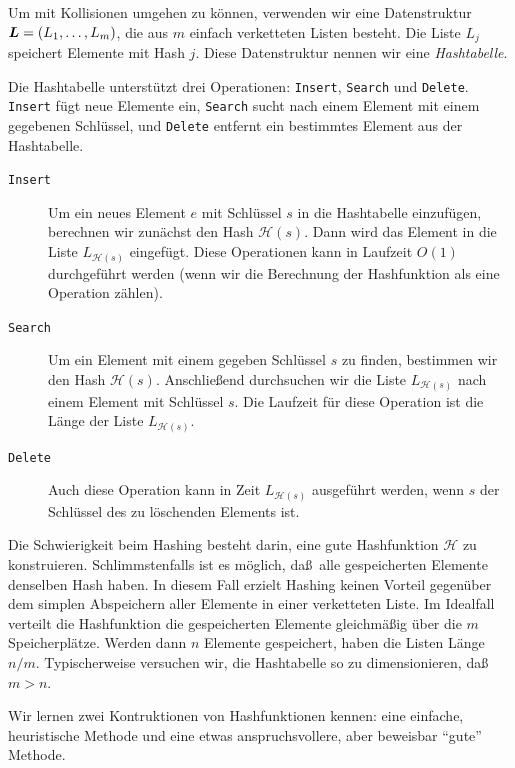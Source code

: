 \documentclass[10pt,reqno]{amsart}
\numberwithin{equation}{section}
\newcommand\cH{\mathcal H}
\newcommand\vL{\vec L}
\def\vec#1{\mathchoice{\mbox{\boldmath$\displaystyle#1$}}
{\mbox{\boldmath$\textstyle#1$}}
{\mbox{\boldmath$\scriptstyle#1$}}
{\mbox{\boldmath$\scriptscriptstyle#1$}}}
\begin{document}
Um mit Kollisionen umgehen zu k\"onnen, verwenden wir eine Datenstruktur $\vL=(L_1,\ldots,L_m)$, die aus $m$ einfach verketteten Listen besteht.
Die Liste $L_j$ speichert Elemente mit Hash $j$.
Diese Datenstruktur nennen wir eine {\em Hashtabelle}.

Die Hashtabelle unterst\"utzt drei Operationen: {\tt Insert}, {\tt Search} und {\tt Delete}.
{\tt Insert} f\"ugt neue Elemente ein, {\tt Search} sucht nach einem Element mit einem gegebenen Schl\"ussel, und {\tt Delete} entfernt ein bestimmtes Element aus der Hashtabelle.

\begin{description}
	\item[{\tt Insert}]
		Um ein neues Element $e$ mit Schl\"ussel $s$ in die Hashtabelle einzuf\"ugen, berechnen wir zun\"achst den Hash $\cH(s)$.
		Dann wird das Element in die Liste $L_{\cH(s)}$ eingef\"ugt.
		Diese Operationen kann in Laufzeit $O(1)$ durchgef\"uhrt werden (wenn wir die Berechnung der Hashfunktion als eine Operation z\"ahlen).
	\item[\tt Search]
		Um ein Element mit einem gegeben Schl\"ussel $s$ zu finden, bestimmen wir den Hash $\cH(s)$. 
		Anschlie\ss end durchsuchen wir die Liste $L_{\cH(s)}$ nach einem Element mit Schl\"ussel $s$.
		Die Laufzeit f\"ur diese Operation ist die L\"ange der Liste $L_{\cH(s)}$.
	\item[\tt Delete] Auch diese Operation kann in Zeit $L_{\cH(s)}$ ausgef\"uhrt werden, wenn $s$ der Schl\"ussel des zu l\"oschenden Elements ist.
\end{description}

Die Schwierigkeit beim Hashing besteht darin, eine gute Hashfunktion $\cH$ zu konstruieren.
Schlimmstenfalls ist es m\"oglich, da\ss\ alle gespeicherten Elemente denselben Hash haben.
In diesem Fall erzielt Hashing keinen Vorteil gegen\"uber dem simplen Abspeichern aller Elemente in einer verketteten Liste.
Im Idealfall verteilt die Hashfunktion die gespeicherten Elemente gleichm\"a\ss ig \"uber die $m$ Speicherpl\"atze.
Werden dann $n$ Elemente gespeichert, haben die Listen L\"ange $n/m$.
Typischerweise versuchen wir, die Hashtabelle so zu dimensionieren, da\ss\ $m>n$.

Wir lernen zwei Kontruktionen von Hashfunktionen kennen: eine einfache, heuristische Methode und eine etwas anspruchsvollere, aber beweisbar ``gute'' Methode.
\end{document}
